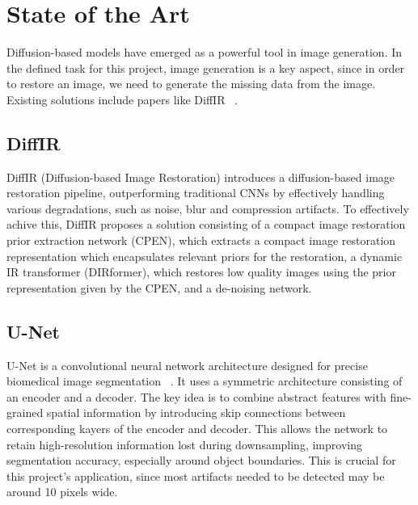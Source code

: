 \documentclass[openany, 12pt]{article}
\begin{document}
	\section{State of the Art}
	{\color{blue}
	Diffusion-based models have emerged as a powerful tool in image generation. In the defined task for this project, image generation is a key aspect, since in order to restore an image, we need to generate the missing data from the image. 
	Existing solutions include papers like DiffIR ~\cite{xia_diffir_2023}.}
	
	\subsection{DiffIR}
	{\color{blue}
	DiffIR (Diffusion-based Image Restoration) introduces a diffusion-based image restoration pipeline, outperforming traditional CNNs by effectively handling various degradations, such as noise, blur and compression artifacts. To effectively achive this, DiffIR proposes a solution consisting of a compact image restoration prior extraction network (CPEN), which extracts a compact image restoration representation which encapsulates relevant priors for the restoration, a dynamic IR transformer (DIRformer), which restores low quality images using the prior representation given by the CPEN, and a de-noising network. }
	\subsection{U-Net}
	U-Net is a convolutional neural network architecture designed for precise biomedical image segmentation  ~\cite{ronneberger_u-net_2015}. It uses a symmetric architecture consisting of an encoder and a decoder. The key idea is to combine abstract features with fine-grained spatial information by introducing skip connections between corresponding kayers of the encoder and decoder. This allows the network to retain high-resolution information lost during downsampling, improving segmentation accuracy, especially around object boundaries. This is crucial for this project's application, since most artifacts needed to be detected may be around 10 pixels wide. \\
\end{document}
